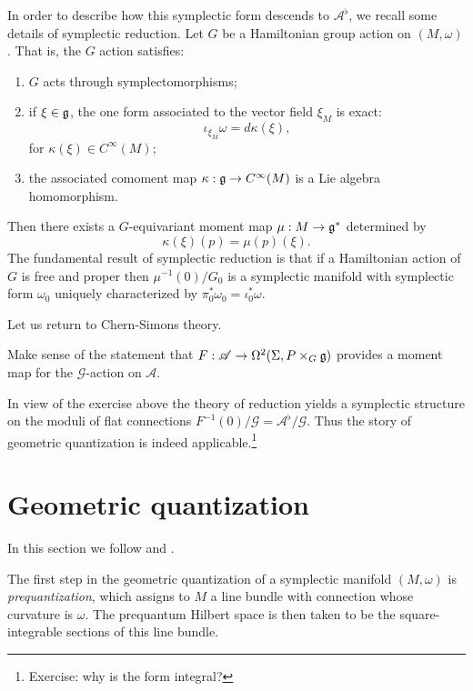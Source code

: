 \documentclass{amsart}
\begin{document}
In order to describe how this symplectic form descends to $\mathscr{A}^\flat$, we recall some details
of symplectic reduction. Let $G$ be a Hamiltonian group action on $(M,\omega)$. That is, the $G$
action satisfies:
\begin{enumerate}
    \item $G$ acts through symplectomorphisms;
    \item if $\xi\in\mathfrak g$, the one form associated to the vector field $\xi_M$ is exact:
        \begin{equation*}
            \iota_{\xi_M}\omega = d\kappa(\xi),
        \end{equation*}
        for $\kappa(\xi)\in C^\infty(M)$;
    \item the associated comoment map $\kappa:\mathfrak g\to C^\infty(M)$ is a Lie algebra homomorphism.
\end{enumerate}
Then there exists a $G$-equivariant moment map $\mu:M\to\mathfrak g^*$ determined by
\begin{equation*}
    \kappa(\xi)(p) = \mu(p)(\xi).
\end{equation*}
The fundamental result of symplectic reduction is that if a Hamiltonian action of $G$ is free and proper
then $\mu^{-1}(0)/G_0$ is a symplectic manifold with symplectic form $\omega_0$ uniquely
characterized by $\pi_0^*\omega_0 = \iota_0^*\omega$.

Let us return to Chern-Simons theory.
\begin{exercise}
    Make sense of the statement that $F:\mathscr{A}\to\Omega^2(\Sigma, P\times_G\mathfrak g)$ provides
    a moment map for the $\mathscr{G}$-action on $\mathscr{A}$.
\end{exercise}
In view of the exercise above the theory of reduction yields a symplectic structure on
the moduli of flat connections $F^{-1}(0)/\mathscr{G}=\mathscr{A}^\flat/\mathscr{G}$.
Thus the story of geometric quantization is indeed applicable.\footnote{Exercise: why is the form integral?}

\section{Geometric quantization}

In this section we follow \cite{wood} and \cite{hall}.

The first step in the geometric quantization of a symplectic manifold $(M,\omega)$ is \textit{prequantization},
which assigns to $M$ a line bundle with connection whose curvature is $\omega$. The prequantum Hilbert
space is then taken to be the square-integrable sections of this line bundle.
\end{document}
